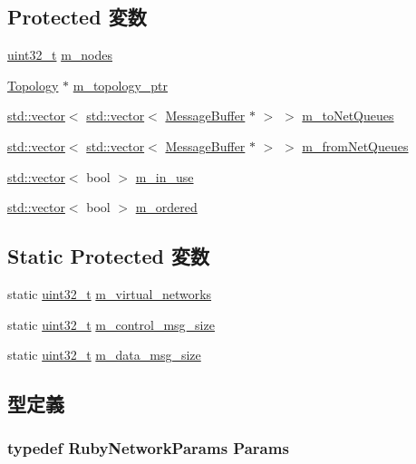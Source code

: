 \subsection*{Protected 変数}
\begin{DoxyCompactItemize}
\item 
\hyperlink{Type_8hh_a435d1572bf3f880d55459d9805097f62}{uint32\_\-t} \hyperlink{classNetwork_aeaedba88d543aaa41c0d3a4a2dda8777}{m\_\-nodes}
\item 
\hyperlink{classTopology}{Topology} $\ast$ \hyperlink{classNetwork_ab71cd6d4ac5c9ca1d70904dd6d633dbc}{m\_\-topology\_\-ptr}
\item 
\hyperlink{classstd_1_1vector}{std::vector}$<$ \hyperlink{classstd_1_1vector}{std::vector}$<$ \hyperlink{classMessageBuffer}{MessageBuffer} $\ast$ $>$ $>$ \hyperlink{classNetwork_ab3540c54c69c669544c78f25ce6f0b55}{m\_\-toNetQueues}
\item 
\hyperlink{classstd_1_1vector}{std::vector}$<$ \hyperlink{classstd_1_1vector}{std::vector}$<$ \hyperlink{classMessageBuffer}{MessageBuffer} $\ast$ $>$ $>$ \hyperlink{classNetwork_a27af683e8bb4ba58e5c79a3e969cfe8a}{m\_\-fromNetQueues}
\item 
\hyperlink{classstd_1_1vector}{std::vector}$<$ bool $>$ \hyperlink{classNetwork_a5d6a051ce5268f65e8e97c963457fdad}{m\_\-in\_\-use}
\item 
\hyperlink{classstd_1_1vector}{std::vector}$<$ bool $>$ \hyperlink{classNetwork_a637cb185f1a2c19da05ac9e2b768129d}{m\_\-ordered}
\end{DoxyCompactItemize}
\subsection*{Static Protected 変数}
\begin{DoxyCompactItemize}
\item 
static \hyperlink{Type_8hh_a435d1572bf3f880d55459d9805097f62}{uint32\_\-t} \hyperlink{classNetwork_a3c1d97c5d987e52985843dcb76edc7fb}{m\_\-virtual\_\-networks}
\item 
static \hyperlink{Type_8hh_a435d1572bf3f880d55459d9805097f62}{uint32\_\-t} \hyperlink{classNetwork_aac98080a2a3db1805c4d49d34e075faa}{m\_\-control\_\-msg\_\-size}
\item 
static \hyperlink{Type_8hh_a435d1572bf3f880d55459d9805097f62}{uint32\_\-t} \hyperlink{classNetwork_a73dbc7ca576dcb0d534f4f65f3e3a25b}{m\_\-data\_\-msg\_\-size}
\end{DoxyCompactItemize}


\subsection{型定義}
\hypertarget{classNetwork_a5ebe6802acb5e6e05b54303c1004f080}{
\subsubsection[{Params}]{\setlength{\rightskip}{0pt plus 5cm}typedef RubyNetworkParams {\bf Params}}}
\label{classNetwork_a5ebe6802acb5e6e05b54303c1004f080}


